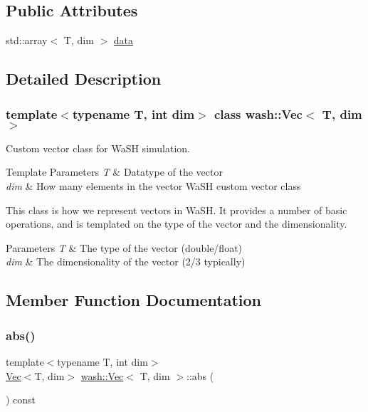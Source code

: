\subsection*{Public Attributes}
\begin{DoxyCompactItemize}
\item 
std\+::array$<$ T, dim $>$ \mbox{\hyperlink{classwash_1_1Vec_a1f8030900a506e51197d5af4ec4d1143}{data}}
\end{DoxyCompactItemize}


\subsection{Detailed Description}
\subsubsection*{template$<$typename T, int dim$>$\newline
class wash\+::\+Vec$<$ T, dim $>$}

Custom vector class for Wa\+SH simulation. 


\begin{DoxyTemplParams}{Template Parameters}
{\em T} & Datatype of the vector \\
\hline
{\em dim} & How many elements in the vector Wa\+SH custom vector class\\
\hline
\end{DoxyTemplParams}
This class is how we represent vectors in Wa\+SH. It provides a number of basic operations, and is templated on the type of the vector and the dimensionality. 
\begin{DoxyParams}{Parameters}
{\em T} & The type of the vector (double/float) \\
\hline
{\em dim} & The dimensionality of the vector (2/3 typically) \\
\hline
\end{DoxyParams}


\subsection{Member Function Documentation}
\mbox{\label{classwash_1_1Vec_aae15a1a2cea7e883e53c2e7f6164710a}} 
\subsubsection{\texorpdfstring{abs()}{abs()}}
{\footnotesize\ttfamily template$<$typename T, int dim$>$ \\
\mbox{\hyperlink{classwash_1_1Vec}{Vec}}$<$T, dim$>$ \mbox{\hyperlink{classwash_1_1Vec}{wash\+::\+Vec}}$<$ T, dim $>$\+::abs (\begin{DoxyParamCaption}{ }\end{DoxyParamCaption}) const\hspace{0.3cm}{\ttfamily [inline]}}

